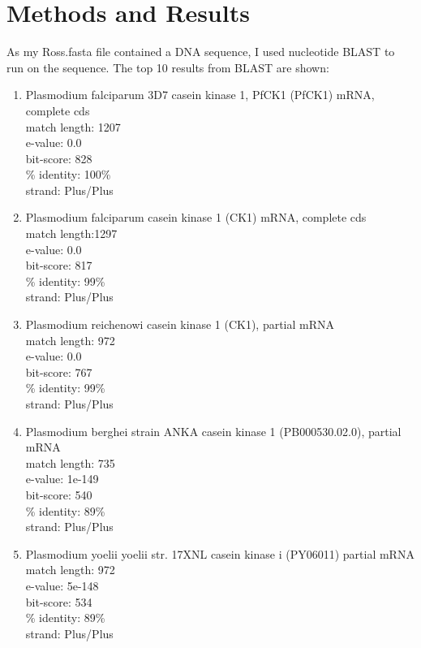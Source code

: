 \documentclass{acm_proc_article-sp}
\begin{document}
\section{Methods and Results}
As my Ross.fasta file contained a DNA sequence, I used nucleotide BLAST to run on the sequence. The top 10 results from BLAST are shown:

\begin{enumerate}
 \item Plasmodium falciparum 3D7 casein kinase 1, PfCK1 (PfCK1) mRNA, complete cds \\
 match length: 1207 \\
 e-value: 0.0 \\
 bit-score: 828 \\
 \% identity: 100\% \\
 strand: Plus/Plus \\
 
 \item Plasmodium falciparum casein kinase 1 (CK1) mRNA, complete cds \\
  match length:1297  \\
 e-value: 0.0 \\
 bit-score: 817 \\
 \% identity: 99\%\\
 strand: Plus/Plus \\
 
 \item Plasmodium reichenowi casein kinase 1 (CK1), partial mRNA \\
  match length: 972 \\
 e-value: 0.0 \\
 bit-score: 767 \\
 \% identity: 99\% \\
 strand: Plus/Plus \\
 
 \item Plasmodium berghei strain ANKA casein kinase 1 (PB000530.02.0), partial mRNA \\
  match length: 735 \\
 e-value: 1e-149 \\
 bit-score: 540 \\
 \% identity: 89\% \\
 strand: Plus/Plus \\
 
 \item Plasmodium yoelii yoelii str. 17XNL casein kinase i (PY06011) partial mRNA \\
  match length: 972 \\
 e-value: 5e-148 \\
 bit-score: 534 \\
 \% identity: 89\% \\
 strand: Plus/Plus \\
 

\end{enumerate}
\end{document}
